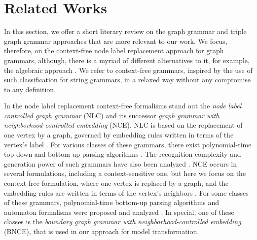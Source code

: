 \documentclass[runningheads]{llncs}
\begin{document}
\section{Related Works}
\label{sec:rw}
In this section, we offer a short literary review on the graph grammar and triple graph grammar approaches that are more relevant to our work. We focus, therefore, on the context-free node label replacement approach for graph grammars, although, there is a myriad of different alternatives to it, for example, the algebraic approach \cite{ehrig1999handbook}. We refer to context-free grammars, inspired by the use of such classification for string grammars, in a relaxed way without any compromise to any definition.


In the node label replacement context-free formalisms stand out the \textit{node label controlled graph grammar} (NLC) and its successor \textit{graph grammar with neighborhood-controlled embedding} (NCE). NLC is based on the replacement of one vertex by a graph, governed by embedding rules written in terms of the vertex's label \cite{rozenberg1986boundary}. For various classes of these grammars, there exist polynomial-time top-down and bottom-up parsing algorithms \cite{flasinski1993parsing,flasinski2014characteristics,rozenberg1986boundary,wanke1991algorithms}. The recognition complexity and generation power of such grammars have also been analyzed \cite{flasinski1998power,kim2012structure}. NCE occurs in several formulations, including a context-sensitive one, but here we focus on the context-free formulation, where one vertex is replaced by a graph, and the embedding rules are written in terms of the vertex's neighbors \cite{janssens1982graph,skodinis1998neighborhood}. For some classes of these grammars, polynomial-time bottom-up parsing algorithms and automaton formalisms were proposed and analyzed \cite{kim2001efficient,brandenburg2005finite}. In special, one of these classes is the \textit{boundary graph grammar with neighborhood-controlled embedding} (BNCE), that is used in our approach for model transformation.
\end{document}
